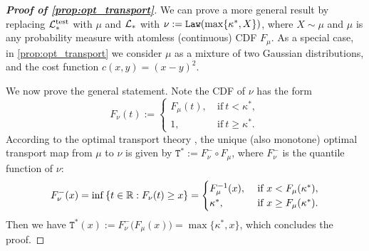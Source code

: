 \begin{proof}[\textbf{Proof of \cref{prop:opt_transport}}]
We can prove a more general result by replacing $\mathcal{L}_*^\mathrm{test}$ with $\mu$ and $\mathcal{L}_*$ with $\nu := \mathtt{Law}(\max\{ \kappa^*, X \})$, where $X \sim \mu$ and $\mu$ is any probability measure with atomless (continuous) CDF $F_\mu$. As a special case, in \cref{prop:opt_transport} we consider $\mu$ as a mixture of two Gaussian distributions, and the cost function $c(x, y) = (x - y)^2$. 

We now prove the general statement. Note the CDF of $\nu$ has the form
\begin{equation*}
    F_\nu(t) :=  
    \begin{cases} 
    F_\mu(t) , & \ \text{if} \ t < \kappa^*, \\
    1, & \ \text{if} \ t \ge \kappa^*.
    \end{cases}
\end{equation*}
According to the optimal transport theory \cite[Theorem 2.5]{santambrogio2015optimal}, the unique (also monotone) optimal transport map from $\mu$ to $\nu$ is given by $\mathtt{T}^* := F_{\nu}^{-} \circ F_{\mu}$, where $F_{\nu}^{-}$ is the quantile function of $\nu$:
\begin{equation*}
    F_{\nu}^{-}(x) = \inf\left\{ t \in \mathbb{R}: F_{\nu}(t) \ge x \right\}
    = 
     \begin{cases} 
    F_\mu^{-1}(x) , & \ \text{if} \ x < F_\mu(\kappa^*), \\
    \kappa^*, & \ \text{if} \ x \ge F_\mu(\kappa^*).
    \end{cases}
\end{equation*}
Then we have $\mathtt{T}^*(x) := F_{\nu}^{-} \bigl( F_{\mu}(x) \bigr) = \max\{ \kappa^*, x \}$, which concludes the proof.
\end{proof}




